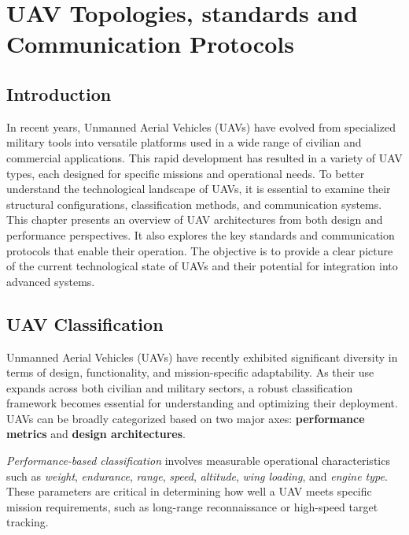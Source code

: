 
\chapter{UAV Topologies, standards and Communication Protocols}
\section*{Introduction}



In recent years, Unmanned Aerial Vehicles (UAVs) have evolved from specialized military tools into versatile platforms used in a wide range of civilian and commercial applications. This rapid development has resulted in a variety of UAV types, each designed for specific missions and operational needs. To better understand the technological landscape of UAVs, it is essential to examine their structural configurations, classification methods, and communication systems. This chapter presents an overview of UAV architectures from both design and performance perspectives. It also explores the key standards and communication protocols that enable their operation. The objective is to provide a clear picture of the current technological state of UAVs and their potential for integration into advanced systems.


\section{UAV Classification}




Unmanned Aerial Vehicles (UAVs) have recently exhibited significant diversity in terms of design, functionality, and mission-specific adaptability. As their use expands across both civilian and military sectors, a robust classification framework becomes essential for understanding and optimizing their deployment. UAVs can be broadly categorized based on two major axes: \textbf{performance metrics} and \textbf{design architectures}.

\vspace{0.5cm}

\textit{Performance-based classification} involves measurable operational characteristics such as \textit{weight}, \textit{endurance}, \textit{range}, \textit{speed}, \textit{altitude}, \textit{wing loading}, and \textit{engine type}. These parameters are critical in determining how well a UAV meets specific mission requirements, such as long-range reconnaissance or high-speed target tracking.

